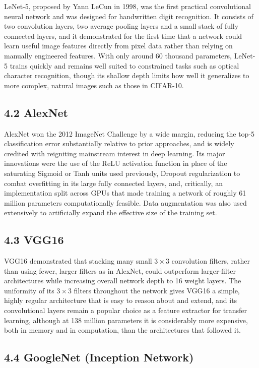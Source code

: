 \documentclass[11pt,a4paper]{article}
\begin{document}
LeNet-5, proposed by Yann LeCun in 1998, was the first practical convolutional neural network and was designed for handwritten digit recognition. It consists of two convolution layers, two average pooling layers and a small stack of fully connected layers, and it demonstrated for the first time that a network could learn useful image features directly from pixel data rather than relying on manually engineered features. With only around 60 thousand parameters, LeNet-5 trains quickly and remains well suited to constrained tasks such as optical character recognition, though its shallow depth limits how well it generalizes to more complex, natural images such as those in CIFAR-10.

\subsection*{4.2 AlexNet}

AlexNet won the 2012 ImageNet Challenge by a wide margin, reducing the top-5 classification error substantially relative to prior approaches, and is widely credited with reigniting mainstream interest in deep learning. Its major innovations were the use of the ReLU activation function in place of the saturating Sigmoid or Tanh units used previously, Dropout regularization to combat overfitting in its large fully connected layers, and, critically, an implementation split across GPUs that made training a network of roughly 61 million parameters computationally feasible. Data augmentation was also used extensively to artificially expand the effective size of the training set.

\subsection*{4.3 VGG16}

VGG16 demonstrated that stacking many small $3\times3$ convolution filters, rather than using fewer, larger filters as in AlexNet, could outperform larger-filter architectures while increasing overall network depth to 16 weight layers. The uniformity of its $3\times3$ filters throughout the network gives VGG16 a simple, highly regular architecture that is easy to reason about and extend, and its convolutional layers remain a popular choice as a feature extractor for transfer learning, although at 138 million parameters it is considerably more expensive, both in memory and in computation, than the architectures that followed it.

\subsection*{4.4 GoogleNet (Inception Network)}
\end{document}
